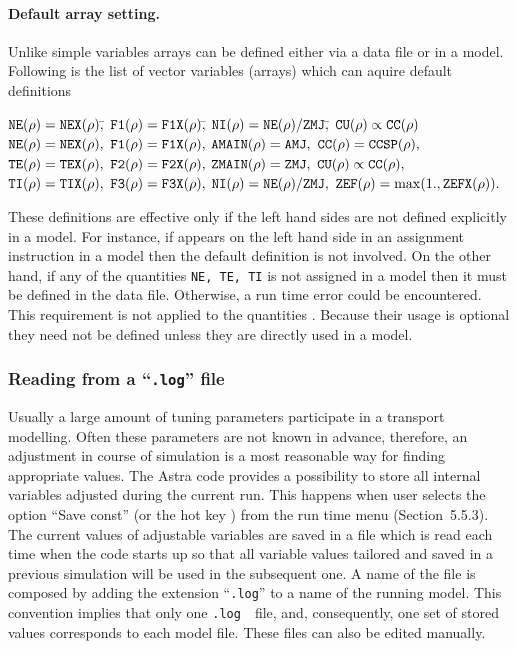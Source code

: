\paragraph{Default array setting.}

Unlike simple variables arrays can be defined either via a data file or
in a model.
Following is the list of vector variables (arrays) which can aquire
default definitions 
\begin{tabbing}
${\tt NE}(\rho)={\tt NEX}({\rho}),$\quad	\=
${\tt F1}(\rho)={\tt F1X}(\rho),$\quad	\=
${\tt NI}(\rho)={\tt NE}(\rho)/{\tt ZMJ},$\quad\=
${\tt CU}(\rho)\propto{\tt CC}(\rho)$\kill
${\tt NE}(\rho)={\tt NEX}(\rho),$	\>
${\tt F1}(\rho)={\tt F1X}(\rho),$	\>
${\tt AMAIN}(\rho)={\tt AMJ},$	\>
${\tt CC}(\rho)={\tt CCSP}(\rho),$\\
${\tt TE}(\rho)={\tt TEX}(\rho),$	\>
${\tt F2}(\rho)={\tt F2X}(\rho),$	\>
${\tt ZMAIN}(\rho)={\tt ZMJ},$	\>
${\tt CU}(\rho)\propto{\tt CC}(\rho),$\\
${\tt TI}(\rho)={\tt TIX}(\rho),$	\>
${\tt F3}(\rho)={\tt F3X}(\rho),$	\>
${\tt NI}(\rho)={\tt NE}(\rho)/{\tt ZMJ},$	\>
${\tt ZEF}(\rho)=\max(1.,{\tt ZEFX}(\rho)).$
\end{tabbing}
These definitions are effective only if the left hand sides are not
defined explicitly in a model. 
For instance, if  appears on the left hand side in an assignment
instruction in a model then the default definition  is not
involved. 
On the other hand, if any of the quantities {\tt NE, TE, TI} is not
assigned in a model then it must be defined in the data file.  
Otherwise, a run time error could be encountered.
This requirement is not applied to the quantities .
Because their usage is optional they need not be defined unless they are
directly used in a model.

\subsubsection{Reading from a ``{\tt.log}'' file}

Usually a large amount of tuning parameters participate in a transport
modelling. 
Often these parameters are not known in advance, therefore, an
adjustment in course of simulation is a most reasonable way for finding
appropriate values. 
The Astra code provides a possibility to store all internal
variables adjusted during the current run.
This happens when user selects the option ``Save const'' (or the hot key
) from the run time menu (Section~5.5.3).
The current values of adjustable variables are saved in a file
which is read each time when the code starts up so that all variable 
values tailored and saved in a previous simulation will be used in the
subsequent one. 
A name of the file is composed by adding the extension ``{\tt .log}'' 
to a name of the running model. 
This convention implies that only one {\tt .log}~~file, and,
consequently, one set of stored values corresponds to each model file. 
These files can also be edited manually.


